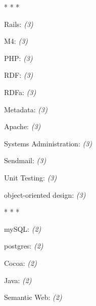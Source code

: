 \documentclass[]{article}
\begin{document}
       

 \begin{center}* * * \end{center}
 Rails: \emph{(3)}
  \label{rails3}

       

 M4: \emph{(3)}
  \label{m43}

       

 PHP: \emph{(3)}
  \label{php3}

       

 RDF: \emph{(3)}
  \label{rdf3}

       

 RDFa: \emph{(3)}
  \label{rdfa3}

       

 Metadata: \emph{(3)}
  \label{metadata3}

       

 Apache: \emph{(3)}
  \label{apache3}

       

 Systems Administration: \emph{(3)}
  \label{systemsadministration3}

       

 Sendmail: \emph{(3)}
  \label{sendmail3}

       

 Unit Testing: \emph{(3)}
  \label{unittesting3}

       

 object-oriented design: \emph{(3)}
  \label{object-orienteddesign3}

       

 \begin{center}* * * \end{center}
 mySQL: \emph{(2)}
  \label{mysql2}

       

 postgres: \emph{(2)}
  \label{postgres2}

       

 Cocoa: \emph{(2)}
  \label{cocoa2}

       

 Java: \emph{(2)}
  \label{java2}

       

 Semantic Web: \emph{(2)}
  \label{semanticweb2}
\end{document}
